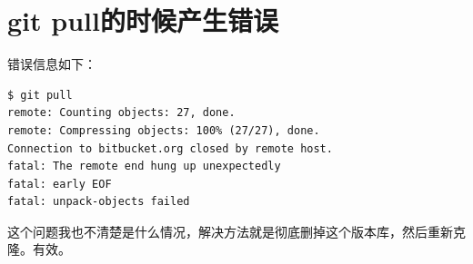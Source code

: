 \documentclass[a4paper,12pt]{ctexart}
\begin{document}
\section{git pull的时候产生错误}
错误信息如下：
\begin{verbatim}
$ git pull
remote: Counting objects: 27, done.
remote: Compressing objects: 100% (27/27), done.
Connection to bitbucket.org closed by remote host.
fatal: The remote end hung up unexpectedly
fatal: early EOF
fatal: unpack-objects failed
\end{verbatim}
这个问题我也不清楚是什么情况，解决方法就是彻底删掉这个版本库，然后重新克隆。有效。
\end{document}

